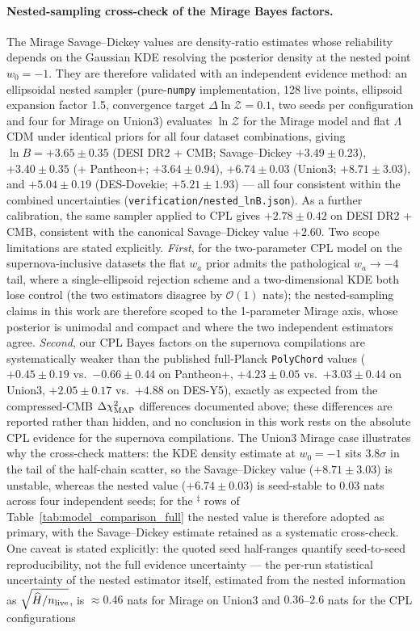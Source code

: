 \documentclass[11pt,letterpaper]{article}
\begin{document}
\paragraph{Nested-sampling cross-check of the Mirage Bayes factors.} The Mirage Savage--Dickey values are density-ratio estimates whose reliability depends on the Gaussian KDE resolving the posterior density at the nested point $w_0 = -1$. They are therefore validated with an independent evidence method: an ellipsoidal nested sampler (pure-\texttt{numpy} implementation, 128 live points, ellipsoid expansion factor 1.5, convergence target $\Delta\ln\mathcal{Z} = 0.1$, two seeds per configuration and four for Mirage on Union3) evaluates $\ln\mathcal{Z}$ for the Mirage model and flat $\Lambda$CDM under identical priors for all four dataset combinations, giving $\ln B = +3.65 \pm 0.35$ (DESI DR2 + CMB; Savage--Dickey $+3.49 \pm 0.23$), $+3.40 \pm 0.35$ (+ Pantheon+; $+3.64 \pm 0.94$), $+6.74 \pm 0.03$ (Union3; $+8.71 \pm 3.03$), and $+5.04 \pm 0.19$ (DES-Dovekie; $+5.21 \pm 1.93$) --- all four consistent within the combined uncertainties (\texttt{verification/nested\_lnB.json}). As a further calibration, the same sampler applied to CPL gives $+2.78 \pm 0.42$ on DESI DR2 + CMB, consistent with the canonical Savage--Dickey value $+2.60$. Two scope limitations are stated explicitly. \emph{First}, for the two-parameter CPL model on the supernova-inclusive datasets the flat $w_a$ prior admits the pathological $w_a \to -4$ tail, where a single-ellipsoid rejection scheme and a two-dimensional KDE both lose control (the two estimators disagree by $\mathcal{O}(1)$ nats); the nested-sampling claims in this work are therefore scoped to the 1-parameter Mirage axis, whose posterior is unimodal and compact and where the two independent estimators agree. \emph{Second}, our CPL Bayes factors on the supernova compilations are systematically weaker than the published full-Planck \texttt{PolyChord} values ($+0.45 \pm 0.19$ vs.\ $-0.66 \pm 0.44$ on Pantheon+, $+4.23 \pm 0.05$ vs.\ $+3.03 \pm 0.44$ on Union3, $+2.05 \pm 0.17$ vs.\ $+4.88$ on DES-Y5), exactly as expected from the compressed-CMB $\Delta\chi^2_{\rm MAP}$ differences documented above; these differences are reported rather than hidden, and no conclusion in this work rests on the absolute CPL evidence for the supernova compilations. The Union3 Mirage case illustrates why the cross-check matters: the KDE density estimate at $w_0 = -1$ sits $3.8\sigma$ in the tail of the half-chain scatter, so the Savage--Dickey value ($+8.71 \pm 3.03$) is unstable, whereas the nested value ($+6.74 \pm 0.03$) is seed-stable to $0.03$ nats across four independent seeds; for the $^{\ddagger}$ rows of Table~\ref{tab:model_comparison_full} the nested value is therefore adopted as primary, with the Savage--Dickey estimate retained as a systematic cross-check. One caveat is stated explicitly: the quoted seed half-ranges quantify seed-to-seed reproducibility, not the full evidence uncertainty --- the per-run statistical uncertainty of the nested estimator itself, estimated from the nested information as $\sqrt{\widehat{H}/n_{\rm live}}$, is $\approx 0.46$ nats for Mirage on Union3 and $0.36$--$2.6$ nats for the CPL configurations 
\end{document}
